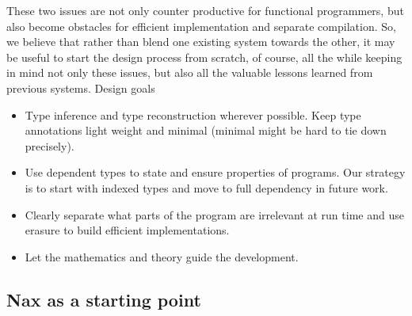 These two issues are not only counter productive for functional programmers, but also
become obstacles for efficient  implementation and separate
compilation. So, we believe that rather than blend one existing system
towards the other, it may be useful to start the design process from scratch,
of course, all the while keeping in mind not only these issues, but also
all the valuable lessons learned from previous systems. Design goals
\begin{itemize}
\item Type inference and type reconstruction wherever possible. Keep type
annotations light weight and minimal (minimal might be hard to tie down precisely).

\item Use dependent types to state and ensure properties of programs. Our strategy
is to start with indexed types and move to full dependency in future work.

\item Clearly separate what parts of the program are irrelevant at run time and
use erasure to build efficient implementations.

\item Let the mathematics and theory guide the development.
\end{itemize}

 

\subsection{Nax as a starting point}
 
